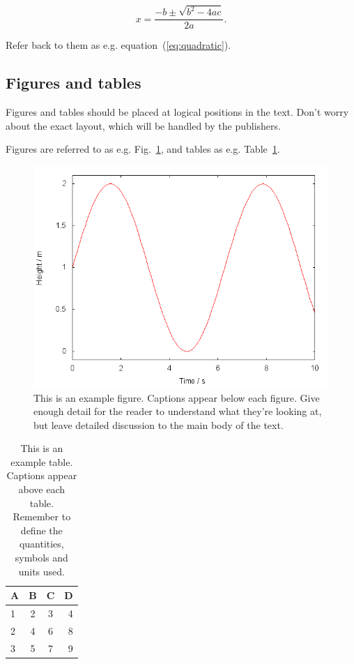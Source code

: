 \documentclass[fleqn,usenatbib]{mnras}
\begin{document}
\begin{equation}
    x=\frac{-b\pm\sqrt{b^2-4ac}}{2a}.
	\label{eq:quadratic}
\end{equation}

Refer back to them as e.g. equation~(\ref{eq:quadratic}).

\subsection{Figures and tables}

Figures and tables should be placed at logical positions in the text. Don't
worry about the exact layout, which will be handled by the publishers.

Figures are referred to as e.g. Fig.~\ref{fig:example_figure}, and tables as
e.g. Table~\ref{tab:example_table}.

\begin{figure}
	\includegraphics[width=\columnwidth]{example}
    \caption{This is an example figure. Captions appear below each figure.
	Give enough detail for the reader to understand what they're looking at,
	but leave detailed discussion to the main body of the text.}
    \label{fig:example_figure}
\end{figure}

\begin{table}
	\centering
	\caption{This is an example table. Captions appear above each table.
	Remember to define the quantities, symbols and units used.}
	\label{tab:example_table}
	\begin{tabular}{lccr} %
		\hline
		A & B & C & D\\
		\hline
		1 & 2 & 3 & 4\\
		2 & 4 & 6 & 8\\
		3 & 5 & 7 & 9\\
		\hline
	\end{tabular}
\end{table}
\end{document}
